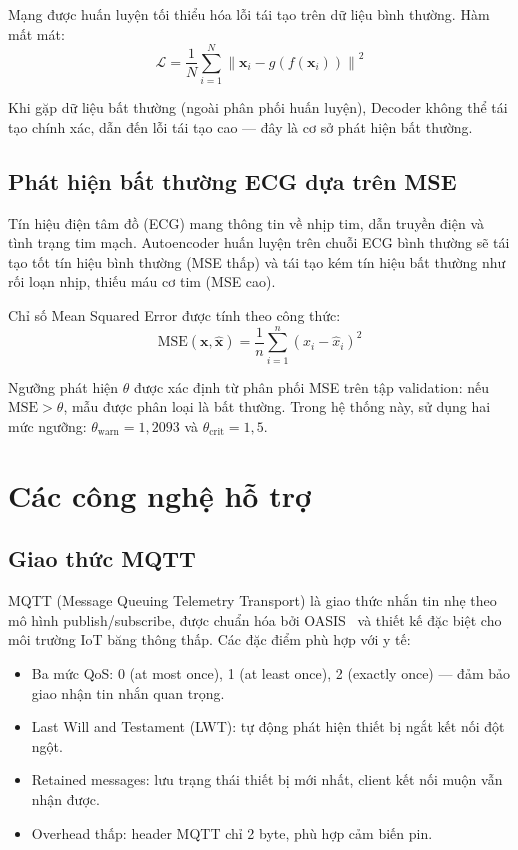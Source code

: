 Mạng được huấn luyện tối thiểu hóa lỗi tái tạo trên dữ liệu bình thường. Hàm mất mát:
\begin{equation}
    \mathcal{L} = \frac{1}{N} \sum_{i=1}^{N} \left\| \mathbf{x}_i - g\!\left(f(\mathbf{x}_i)\right) \right\|^2
    \label{eq:loss}
\end{equation}

Khi gặp dữ liệu bất thường (ngoài phân phối huấn luyện), Decoder không thể tái tạo chính xác, dẫn đến lỗi tái tạo cao — đây là cơ sở phát hiện bất thường.

\subsection{Phát hiện bất thường ECG dựa trên MSE}

Tín hiệu điện tâm đồ (ECG) mang thông tin về nhịp tim, dẫn truyền điện và tình trạng tim mạch. Autoencoder huấn luyện trên chuỗi ECG bình thường sẽ tái tạo tốt tín hiệu bình thường (MSE thấp) và tái tạo kém tín hiệu bất thường như rối loạn nhịp, thiếu máu cơ tim (MSE cao).

Chỉ số Mean Squared Error được tính theo công thức:
\begin{equation}
    \text{MSE}(\mathbf{x}, \hat{\mathbf{x}}) = \frac{1}{n} \sum_{i=1}^{n} (x_i - \hat{x}_i)^2
    \label{eq:mse}
\end{equation}

Ngưỡng phát hiện $\theta$ được xác định từ phân phối MSE trên tập validation: nếu $\text{MSE} > \theta$, mẫu được phân loại là bất thường. Trong hệ thống này, sử dụng hai mức ngưỡng: $\theta_{\text{warn}} = 1{,}2093$ và $\theta_{\text{crit}} = 1{,}5$.

\section{Các công nghệ hỗ trợ}

\subsection{Giao thức MQTT}

MQTT (Message Queuing Telemetry Transport) là giao thức nhắn tin nhẹ theo mô hình publish/subscribe, được chuẩn hóa bởi OASIS~\cite{mqtt_spec} và thiết kế đặc biệt cho môi trường IoT băng thông thấp. Các đặc điểm phù hợp với y tế:

\begin{itemize}
    \item Ba mức QoS: 0 (at most once), 1 (at least once), 2 (exactly once) — đảm bảo giao nhận tin nhắn quan trọng.
    \item Last Will and Testament (LWT): tự động phát hiện thiết bị ngắt kết nối đột ngột.
    \item Retained messages: lưu trạng thái thiết bị mới nhất, client kết nối muộn vẫn nhận được.
    \item Overhead thấp: header MQTT chỉ 2 byte, phù hợp cảm biến pin.
\end{itemize}

